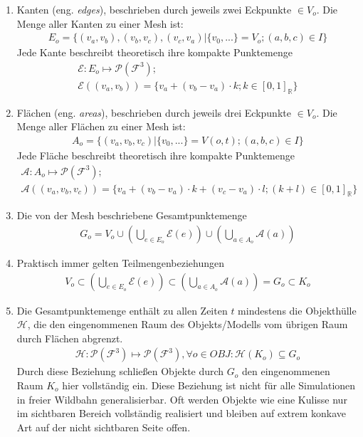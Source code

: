 \begin{enumerate}
\item Kanten (eng. \textit{edges}), beschrieben durch jeweils zwei Eckpunkte $\in V_o$. 
Die Menge aller Kanten zu einer Mesh ist:
\begin{align}
E_o = \{(v_a, v_b), (v_b, v_c),(v_c, v_a) | \{v_0, ...\} = V_o;(a, b, c) \in I\}
\end{align}
Jede Kante beschreibt theoretisch ihre kompakte Punktemenge 
\begin{align}
\mathcal{E}:E_o\mapsto\mathcal{P}(\mathcal{F}^3);\\
\mathcal{E}((v_a, v_b)) = \{v_a + (v_b-v_a) \cdot k; k \in [0,1]_{\mathbb{R}}\}
\end{align}

\item Flächen (eng. \textit{areas}), beschrieben durch jeweils drei Eckpunkte $\in V_o$.
Die Menge aller Flächen zu einer Mesh ist:
\begin{align}
A_o = \{(v_a, v_b, v_c) | \{v_0, ... \} = V(o, t); (a, b, c) \in I\}
\end{align}
Jede Fläche beschreibt theoretisch ihre kompakte Punktemenge
\begin{align}
\mathcal{A}:A_o\mapsto \mathcal{P}(\mathcal{F}^3);\\
\mathcal{A}((v_a, v_b, v_c)) = \{v_a + (v_b-v_a)\cdot k + (v_c-v_a)\cdot l; (k+l) \in [0,1]_{\mathbb{R}}\}
\end{align}
\item Die von der Mesh beschriebene Gesamtpunktemenge 
\begin{align}
G_o = V_o \cup (\bigcup_{e\in E_o} \mathcal{E}(e)) \cup (\bigcup_{a\in A_o} \mathcal{A}(a))
\end{align}
\item Praktisch immer gelten Teilmengenbeziehungen
\begin{align}
V_o \subset (\bigcup_{e\in E_o} \mathcal{E}(e)) \subset (\bigcup_{a\in A_o} \mathcal{A}(a)) = G_o \subset K_o
\end{align}

\item Die Gesamtpunktemenge enthält zu allen Zeiten $t$ mindestens die Objekthülle $\mathcal{H}$, die den eingenommenen Raum des Objekts/Modells vom übrigen Raum durch Flächen abgrenzt.
\begin{align}
	\mathcal{H}:\mathcal{P}(\mathcal{F}^3) \mapsto \mathcal{P}(\mathcal{F}^3), \forall o\in OBJ: \mathcal{H}(K_o) \subseteq G_o
\end{align}
Durch diese Beziehung schließen Objekte durch $G_o$ den eingenommenen Raum $K_o$ hier vollständig ein. Diese Beziehung ist nicht für alle Simulationen in freier Wildbahn generalisierbar. Oft werden Objekte wie eine Kulisse nur im sichtbaren Bereich vollständig realisiert und bleiben auf extrem konkave Art auf der nicht sichtbaren Seite offen.


\end{enumerate}


